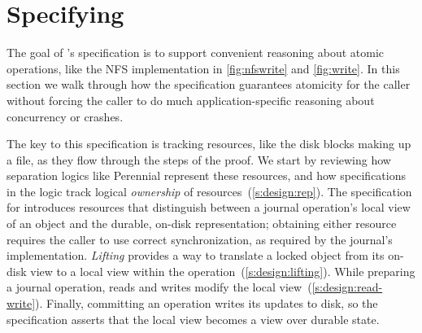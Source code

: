 

\section{Specifying \txn}
\label{s:design}




The goal of \txn's specification is to support convenient reasoning about atomic
operations, like the NFS  implementation in \autoref{fig:nfswrite} and \autoref{fig:write}.
In this section we walk through how the specification
guarantees atomicity for the caller without forcing the caller to do
much application-specific reasoning about concurrency or
crashes.

The key to this specification is tracking resources, like the disk blocks making up a
file, as they flow through the steps of the proof. We start by reviewing how
separation logics like Perennial represent these resources, and how
specifications in the logic track logical \emph{ownership} of
resources~(\autoref{s:design:rep}). The specification for \txn introduces
resources that distinguish between a journal operation's local view of an object and
the durable, on-disk representation; obtaining either resource
requires the caller to use correct synchronization, as required by the journal's
implementation. \emph{Lifting} provides a
way to translate
a locked object from its on-disk view to a local view within the operation~(\autoref{s:design:lifting}).
While preparing a journal operation, reads and writes modify the local
view~(\autoref{s:design:read-write}). Finally, committing an operation writes
its updates to disk, so the specification asserts that the local
view becomes a view over durable state.

